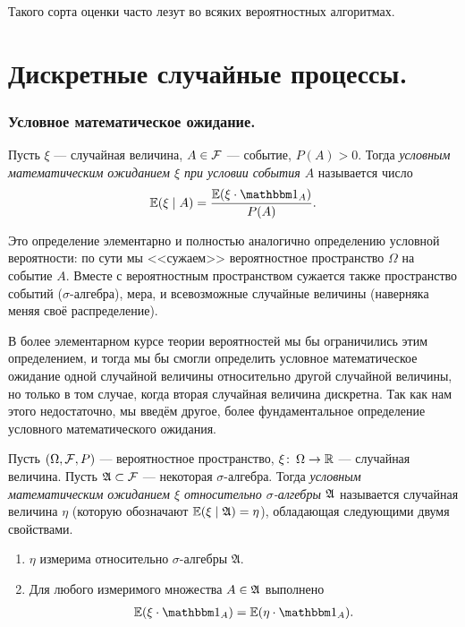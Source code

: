 \documentclass[../main.tex]{subfiles}
\begin{document}
Такого сорта оценки часто лезут во всяких вероятностных алгоритмах.

\newpage
\part{Дискретные случайные процессы.}
\section{Условное математическое ожидание.}

\begin{df}
 Пусть $ \xi $  --- случайная величина, $ A \in \mathcal F $  --- событие, $ P(A) > 0 $. Тогда \textit{условным математическим ожиданием $ \xi $ при условии события $ A $} называется число
 \begin{align*}
  \E(\xi \mid A) = \frac{\E (\xi \cdot \Ind_A)}{P(A)}.
 \end{align*}
\end{df}

Это определение элементарно и полностью аналогично определению условной вероятности: по сути мы <<сужаем>> вероятностное пространство $ \Omega $ на событие $ A $. Вместе с вероятностным пространством сужается также пространство событий ($ \sigma $-алгебра), мера, и всевозможные случайные величины (наверняка меняя своё распределение).

В более элементарном курсе теории вероятностей мы бы ограничились этим определением, и тогда мы бы смогли определить условное математическое ожидание одной случайной величины относительно другой случайной величины, но только в том случае, когда вторая случайная величина дискретна. Так как нам этого недостаточно, мы введём другое, более фундаментальное определение условного математического ожидания.

\begin{df}
 \label{df:umo}
 Пусть $ (\Omega, \mathcal F, P) $ --- вероятностное пространство, $ \xi \colon \, \Omega \to \mathbb{R} $ --- случайная величина. Пусть $ \mathfrak A \subset \mathcal F $ --- некоторая $ \sigma $-алгебра. Тогда \textit{условным математическим ожиданием $ \xi $ относительно $ \sigma $-алгебры $ \mathfrak A $} называется случайная величина $ \eta $ (которую обозначают $ \mathbb E(\xi \mid \mathfrak A) = \eta $), обладающая следующими двумя свойствами.
 \begin{enumerate}
  \item $ \eta $ измерима относительно $ \sigma $-алгебры $ \mathfrak A $.
  \item Для любого измеримого множества $ A \in \mathfrak A $ выполнено
   \begin{align}
    \label{eq:def:umo}
    \E(\xi \cdot \Ind_A) = \E(\eta \cdot \Ind_A).
   \end{align}
 \end{enumerate}
\end{df}
\end{document}
